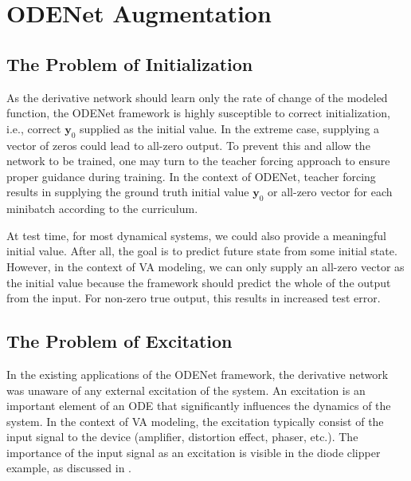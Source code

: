 \section{ODENet Augmentation}

\subsection{The Problem of Initialization}

As the derivative network should learn only the rate of change of the modeled function, the ODENet framework is highly susceptible to correct initialization, i.e., correct $\pmb{y}_0$ supplied as the initial value. In the extreme case, supplying a vector of zeros could lead to all-zero output. To prevent this and allow the network to be trained, one may turn to the teacher forcing approach
to ensure proper guidance during training. In the context of ODENet, teacher forcing results in supplying the ground truth initial value $\pmb{y}_0$ or all-zero vector for each minibatch according to the curriculum.

At test time, for most dynamical systems, we could also provide a meaningful initial value. After all, the goal is to predict future state from some initial state. However, in the context of \ac{VA} modeling, we can only supply an all-zero vector as the initial value because the framework should predict the whole of the output from the input. For non-zero true output, this results in increased test error.

\subsection{The Problem of Excitation}

In the existing applications of the ODENet framework, the derivative network was unaware of any external excitation of the system. An excitation is an important element of an \ac{ODE} that significantly influences the dynamics of the system. In the context of \ac{VA} modeling, the excitation typically consist of the input signal to the device (amplifier, distortion effect, phaser, etc.). The importance of the input signal as an excitation is visible in the diode clipper example, as discussed in .

